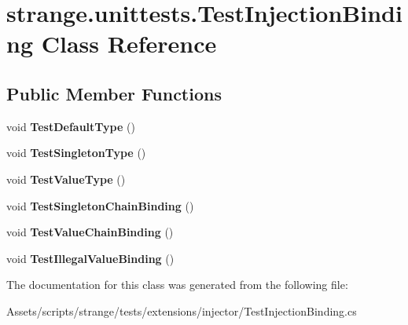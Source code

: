 \hypertarget{classstrange_1_1unittests_1_1_test_injection_binding}{\section{strange.\-unittests.\-Test\-Injection\-Binding Class Reference}
\label{classstrange_1_1unittests_1_1_test_injection_binding}
}
\subsection*{Public Member Functions}
\begin{DoxyCompactItemize}
\item 
\hypertarget{classstrange_1_1unittests_1_1_test_injection_binding_a624e7ce61cbc7acf6566c496ce3edaa5}{void {\bfseries Test\-Default\-Type} ()}\label{classstrange_1_1unittests_1_1_test_injection_binding_a624e7ce61cbc7acf6566c496ce3edaa5}

\item 
\hypertarget{classstrange_1_1unittests_1_1_test_injection_binding_a0276f52b158dfc14fa973b49caa2d6fb}{void {\bfseries Test\-Singleton\-Type} ()}\label{classstrange_1_1unittests_1_1_test_injection_binding_a0276f52b158dfc14fa973b49caa2d6fb}

\item 
\hypertarget{classstrange_1_1unittests_1_1_test_injection_binding_ae743e1981411929f66a12bb485637db3}{void {\bfseries Test\-Value\-Type} ()}\label{classstrange_1_1unittests_1_1_test_injection_binding_ae743e1981411929f66a12bb485637db3}

\item 
\hypertarget{classstrange_1_1unittests_1_1_test_injection_binding_ad8e26e6e3a53b86c6352a22254c8c91f}{void {\bfseries Test\-Singleton\-Chain\-Binding} ()}\label{classstrange_1_1unittests_1_1_test_injection_binding_ad8e26e6e3a53b86c6352a22254c8c91f}

\item 
\hypertarget{classstrange_1_1unittests_1_1_test_injection_binding_acc5fdfb4757e599e0c34c8ce150abe46}{void {\bfseries Test\-Value\-Chain\-Binding} ()}\label{classstrange_1_1unittests_1_1_test_injection_binding_acc5fdfb4757e599e0c34c8ce150abe46}

\item 
\hypertarget{classstrange_1_1unittests_1_1_test_injection_binding_a896825a5ab851e350974336be5d7ea97}{void {\bfseries Test\-Illegal\-Value\-Binding} ()}\label{classstrange_1_1unittests_1_1_test_injection_binding_a896825a5ab851e350974336be5d7ea97}

\end{DoxyCompactItemize}


The documentation for this class was generated from the following file\-:\begin{DoxyCompactItemize}
\item 
Assets/scripts/strange/tests/extensions/injector/Test\-Injection\-Binding.\-cs\end{DoxyCompactItemize}
